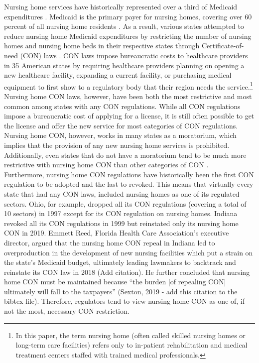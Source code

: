 \documentclass[../Main.tex]{subfiles}
\begin{document}
Nursing home services have historically represented over a third of Medicaid expenditures \citep{wiener1999controlling}. Medicaid is the primary payer for nursing homes, covering over 60 percent of all nursing home residents . As a result, various states attempted to reduce nursing home Medicaid expenditures by restricting the number of nursing homes and nursing home beds in their respective states through Certificate-of-need (CON) laws \citep{feder1980regulating,grabowski2003effects,rahman2016impact}. CON laws impose bureaucratic costs to healthcare providers in 35 American states by requiring healthcare providers planning on opening a new healthcare facility, expanding a current facility, or purchasing medical equipment to first show to a regulatory body that their region needs the service.\footnote{In this paper, the term nursing home (often called skilled nursing homes or long-term care facilities) refers only to in-patient rehabilitation and medical treatment centers staffed with trained medical professionals.}\\
\indent Nursing home CON laws, however, have been both the most restrictive and most common among states with any CON regulations. While all CON regulations impose a bureaucratic cost of applying for a license, it is still often possible to get the license and offer the new service for most categories of CON regulations.  Nursing home CON, however, works in many states as a moratorium, which implies that the provision of any new nursing home services is prohibited. Additionally, even states that do not have a moratorium tend to be much more restrictive with nursing home CON than other categories of CON \citep{american2020american}.\\
\indent Furthermore, nursing home CON regulations have historically been the first CON regulation to be adopted and the last to revoked. This means that virtually every state that had any CON laws, included nursing homes as one of its regulated sectors. Ohio, for example, dropped all its CON regulations (covering a total of 10 sectors) in 1997 except for its CON regulation on nursing homes. Indiana revoked all its CON regulations in 1999 but reinstated only its nursing home CON in 2019. Emmett Reed, Florida Health Care Association’s executive director, argued that the nursing home CON repeal in Indiana led to overproduction in the development of new nursing facilities which put a strain on the state’s Medicaid budget, ultimately leading lawmakers to backtrack and reinstate its CON law in 2018 (Add citation). He further concluded that nursing home CON must be maintained because “the burden [of repealing CON] ultimately will fall to the taxpayers” (Sexton, 2019 - add this citation to the bibtex file). Therefore, regulators tend to view nursing home CON as one of, if not the most, necessary CON restriction.\\
\end{document}
